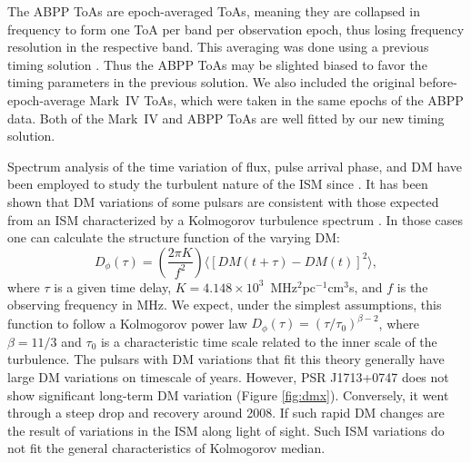 The ABPP ToAs are epoch-averaged ToAs, meaning they are collapsed in frequency to form one ToA per band per observation epoch, thus losing frequency resolution in the respective band. 
This averaging was done using a previous timing solution 
\citep{sns+05}. Thus the ABPP ToAs may be slighted biased to favor the
timing parameters in the previous solution. We also included the original
before-epoch-average Mark~IV ToAs, which were taken in the same epochs of the
ABPP data. Both of the Mark~IV and ABPP  ToAs are well fitted by our new
timing solution.


Spectrum analysis of the time variation of flux, pulse arrival phase, and DM have 
been employed to study the turbulent nature of the ISM since \citealt{cpl86, rl90}.
It has been shown that DM variations of some pulsars are consistent with
those expected from an ISM characterized by a Kolmogorov turbulence spectrum
\citep{cwd+90, ric90, ktr94, yhc+07, kcs+13, fst14}. In those cases one can calculate the 
structure function of the varying DM: 
\begin{equation}
D_{\phi}(\tau)=\left(\frac{2\pi K}{f^2}\right)\langle [DM(t+\tau)-DM(t)]^2\rangle, 
\end{equation}
where $\tau$ 
is a given time delay, $K=4.148\times10^3$~MHz$^2$pc$^{-1}$cm$^3$s, and $f$ is 
the observing frequency in MHz. We expect, under the simplest assumptions, 
this function to follow a Kolmogorov power law $D_{\phi}(\tau)=(\tau/\tau_0)^{\beta -2}$, 
where $\beta=11/3$ and $\tau_0$ is a characteristic time scale related to 
the inner scale of the turbulence. The pulsars with DM variations that fit this
theory generally have large DM variations on timescale of 
years. However, PSR J1713+0747 does not show significant long-term DM variation 
(Figure \ref{fig:dmx}). Conversely, it went through a steep drop and recovery 
around 2008. If such rapid DM changes are the result of variations in the ISM along
light of sight. Such ISM variations do not fit the general characteristics of Kolmogorov median. 

